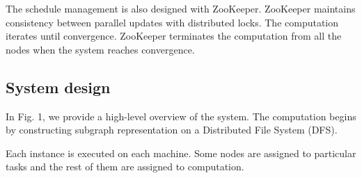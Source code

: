 The schedule management is also designed with ZooKeeper. ZooKeeper maintains consistency between parallel updates with distributed locks. 
The computation iterates until convergence. ZooKeeper terminates the computation from all the nodes when the system reaches convergence. 


\subsection{System design}
In Fig. 1, we provide a high-level overview of the system. 
The computation begins by constructing subgraph representation on a Distributed File System (DFS). 

Each instance is executed on each machine. 
Some nodes are assigned to particular tasks and the rest of them are assigned to computation. 
